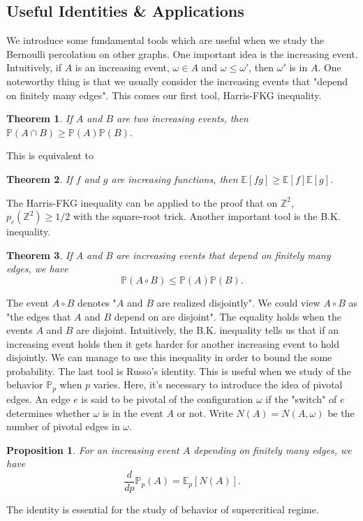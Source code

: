\documentclass[12pt]{article}
\theoremstyle{plane}
\newtheorem*{thm}{Theorem}
\newtheorem*{prop}{Proposition}
\theoremstyle{definition}
\begin{document}
\subsection{Useful Identities \& Applications}
We introduce some fundamental tools which are useful when we study the Bernoulli percolation on other graphs. One important idea is the increasing event. Intuitively, if $A$ is an increasing event, $\omega\in A$ and $\omega\leq\omega'$, then $\omega'$ is in $A$. One noteworthy thing is that we usually consider the increasing events that "depend on finitely many edges". This comes our first tool, Harris-FKG inequality.
\begin{thm}
If $A$ and $B$ are two increasing events, then $\mathbb{P}(A\cap B)\geq \mathbb{P}(A)\mathbb{P}(B)$.
\end{thm}
This is equivalent to 
\begin{thm}
If \(f\) and \(g\) are increasing functions, then $\mathbb{E}[fg]\geq\mathbb{E}[f]\mathbb{E}[g].$
\end{thm}
The Harris-FKG inequality can be applied to the proof that on $\mathbb{Z}^2$, $p_c(\mathbb{Z}^2)\geq 1/2$ with the square-root trick. Another important tool is the B.K. inequality.
\begin{thm}
If A and B are increasing events that depend on finitely many edges, we have \[\mathbb{P}(A\circ B)\leq\mathbb{P}(A)\mathbb{P}(B).\]
\end{thm}
The event $A\circ B$ denotes "$A$ and $B$ are realized disjointly". We could view $A\circ B$ as "the edges that $A$ and $B$ depend on are disjoint". The equality holds when the events $A$ and $B$ are disjoint. Intuitively, the B.K. inequality tells us that if an increasing event holds then it gets harder for another increasing event to hold disjointly. We can manage to use this inequality in order to bound the some probability. The last tool is Russo's identity. This is useful when we study of the behavior $\mathbb{P}_p$ when $p$ varies. Here, it's necessary to introduce the idea of 
pivotal edges. An edge $e$ is said to be pivotal of the configuration $\omega$ if the "switch" of $e$ determines whether $\omega$ is in the event $A$ or not. Write $N(A)=N(A,\omega)$ be the number of pivotal edges in $\omega$. 
\begin{prop}
For an increasing event $A$ depending on finitely many edges, we have \[\frac{d}{dp}\mathbb{P}_p (A)=\mathbb{E}_p[N(A)].\]
\end{prop}
The identity is essential for the study of behavior of supercritical regime. 
\end{document}
